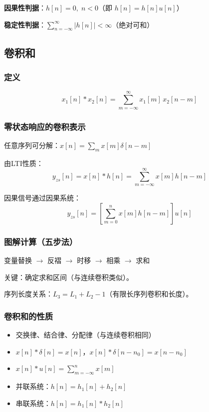 \documentclass[11pt,a4paper]{ctexart}
\newcommand{\dirac}{\delta}             %
\begin{document}
\textbf{因果性判据}：$h[n] = 0,\; n < 0$（即 $h[n] = h[n]u[n]$）

\textbf{稳定性判据}：$\sum_{n=-\infty}^{\infty} |h[n]| < \infty$（绝对可和）

\subsection{卷积和}

\subsubsection{定义}
\[
x_1[n] * x_2[n] = \sum_{m=-\infty}^{\infty} x_1[m]\,x_2[n-m]
\]

\subsubsection{零状态响应的卷积表示}
任意序列可分解：$x[n] = \sum_m x[m]\dirac[n-m]$

由LTI性质：
\[
\boxed{y_{zs}[n] = x[n] * h[n] = \sum_{m=-\infty}^{\infty} x[m]h[n-m]}
\]

因果信号通过因果系统：
\[
y_{zs}[n] = \left[\sum_{m=0}^{n} x[m]h[n-m]\right]u[n]
\]

\subsubsection{图解计算（五步法）}
变量替换 $\to$ 反褶 $\to$ 时移 $\to$ 相乘 $\to$ 求和

关键：确定求和区间（与连续卷积类似）。

序列长度关系：$L_3 = L_1 + L_2 - 1$（有限长序列卷积和长度）。

\subsubsection{卷积和的性质}
\begin{itemize}
    \item 交换律、结合律、分配律（与连续卷积相同）
    \item $x[n] * \dirac[n] = x[n]$，$x[n] * \dirac[n - n_0] = x[n - n_0]$
    \item $x[n] * u[n] = \sum_{m=-\infty}^{n} x[m]$
    \item 并联系统：$h[n] = h_1[n] + h_2[n]$
    \item 串联系统：$h[n] = h_1[n] * h_2[n]$
\end{itemize}

\newpage
\end{document}
